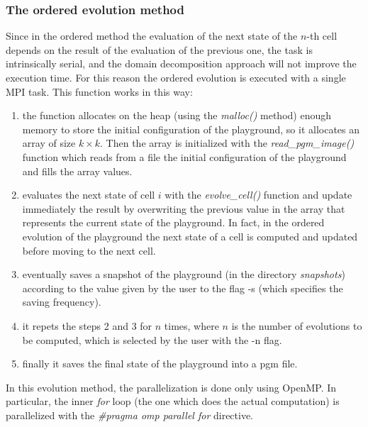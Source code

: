 \documentclass[12pt, titlepage]{report}
\begin{document}
\subsubsection{The ordered evolution method}
Since in the ordered method the evaluation of the next state of the $n$-th cell depends on the result of the evaluation of the previous one, 
the task is intrinsically serial, and the domain decomposition approach will not improve the execution time. For this reason the ordered evolution 
is executed with a single MPI task. This function works in this way:
\begin{enumerate}
	\item the function allocates on the heap (using the \emph{malloc()} method) enough memory to store the initial configuration of the playground, 
	so it allocates an array of size $k\times k$. Then the array is initialized with the \emph{read\_pgm\_image()} function which reads from a file 
	the initial configuration of the playground and fills the array values. 
	\item evaluates the next state of cell $i$ with the \emph{evolve\_cell()} function and update immediately the result by overwriting the previous value
	in the array that represents the current state of the playground. In fact, in the ordered evolution of the playground the next state of a cell 
	is computed and updated before moving to the next cell.
	\item eventually saves a snapshot of the playground (in the directory \emph{snapshots}) according to the value given by the user to the flag -s 
	(which specifies the saving frequency). 
	\item it repets the steps 2 and 3 for $n$ times, where $n$ is the number of evolutions to be computed, which is selected by the user with the -n flag.
	\item finally it saves the final state of the playground into a pgm file. 
\end{enumerate}
In this evolution method, the parallelization is done only using OpenMP. In particular, the inner \emph{for} loop (the one which does the actual computation)
is parallelized with the \emph{\#pragma omp parallel for} directive.
\end{document}
